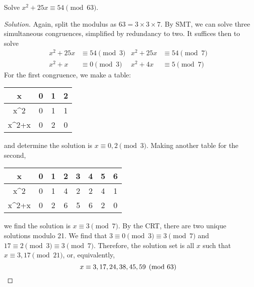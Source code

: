 \question Solve $x^2 + 25x \equiv 54 \pmod{63}$.
\begin{proof}[Solution]
  Again, split the modulus as $63 = 3 \times 3 \times 7$.
  By SMT, we can solve three simultaneous congruences, simplified by redundancy to two.
  It suffices then to solve
  \begin{align*}
    x^2 + 25x & \equiv 54 \pmod{3} & x^2 + 25x & \equiv 54 \pmod{7} \\
    x^2 + x   & \equiv 0 \pmod{3}  & x^2 + 4x  & \equiv 5 \pmod{7}
  \end{align*}
  For the first congruence, we make a table:
  \begin{center}
    \begin{tabular}{C|C|C|C}
      x      & 0 & 1 & 2 \\ \hline
      x^2    & 0 & 1 & 1 \\
      x^2+x  & 0 & 2 & 0
    \end{tabular}
  \end{center}
  and determine the solution is $x \equiv 0,2 \pmod{3}$.
  Making another table for the second,
  \begin{center}
    \begin{tabular}{C|C|C|C|C|C|C|C}
      x      & 0 & 1 & 2 & 3 & 4 & 5 & 6 \\ \hline
      x^2    & 0 & 1 & 4 & 2 & 2 & 4 & 1 \\
      x^2+x  & 0 & 2 & 6 & 5 & 6 & 2 & 0
    \end{tabular}
  \end{center}
  we find the solution is $x \equiv 3 \pmod{7}$.
  By the CRT, there are two unique solutions modulo 21.
  We find that $3 \equiv 0 \pmod{3} \equiv 3 \pmod{7}$ and $17 \equiv 2 \pmod{3} \equiv 3 \pmod{7}$.
  Therefore, the solution set is all $x$ such that $x \equiv 3,17 \pmod{21}$, or, equivalently,
  \[ x \equiv 3,17,24,38,45,59 \pmod{63} \qedhere \]
\end{proof}


